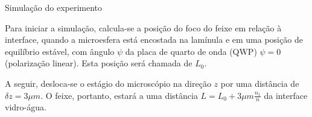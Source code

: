 \documentclass[10pt]{beamer}
\begin{document}
\begin{frame}[fragile]{Simulação do experimento}

    \begin{center}

        Para iniciar a simulação, calcula-se a posição do foco do feixe em relação à interface, quando a microesfera está encostada na lamínula e em uma posição de equilíbrio estável, com ângulo $\psi$ da placa de quarto de onda (QWP) $\psi=0$ (polarização linear). Esta posição será chamada de $L_0$.

        A seguir, desloca-se o estágio do microscópio na direção $z$ por uma distância de $\delta z = 3 \mu m$. O feixe, portanto, estará a uma distância $L=L_0 + 3 \mu m \frac{n_1}{n}$ da interface vidro-água.

    \end{center}

\end{frame}
\end{document}
